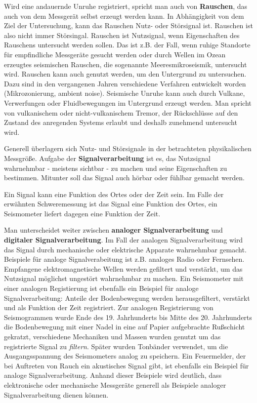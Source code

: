 Wird eine andauernde Unruhe registriert, spricht man auch von {\bf Rauschen}, das auch von dem Messgerät selbst erzeugt werden kann. In Abhängigkeit von dem Ziel der Untersuchung, kann das Rauschen Nutz- oder Störsignal ist.  Rauschen ist also nicht immer Störsingal. Rauschen ist Nutzsignal, wenn Eigenschaften des Rauschens untersucht werden sollen. Das ist z.B. der Fall, wenn ruhige Standorte für empfindliche Messgeräte gesucht werden oder durch Wellen im Ozean erzeugtes seismischen Rauschen, die sogenannte Meeresmikroseismik, untersucht wird. Rauschen kann auch genutzt werden, um den Untergrund zu untersuchen. Dazu sind in den vergangenen Jahren verschiedene Verfahren entwickelt worden (Mikrozonierung, ambient noise). Seismische Unruhe kann auch durch Vulkane, Verwerfungen oder Fluidbewegungen im Untergrund erzeugt werden. Man spricht von vulkanischem oder nicht-vulkanischem Tremor, der Rückschlüsse auf den Zustand des anregenden Systems erlaubt und deshalb zunehmend untersucht wird.  

Generell überlagern sich Nutz- und Störsignale in der betrachteten physikalischen Messgröße. Aufgabe der {\bf Signalverarbeitung} ist es, das Nutzsignal wahrnehmbar - meistens sichtbar - zu machen und seine Eigenschaften zu bestimmen. Mitunter soll das Signal auch hörbar oder fühlbar gemacht werden.    

Ein Signal kann eine Funktion des Ortes oder der Zeit sein. Im Falle der erwähnten Schweremessung ist das Signal eine Funktion des Ortes, ein Seismometer liefert dagegen eine Funktion der Zeit.

Man unterscheidet weiter zwischen \textbf{analoger Signalverarbeitung} und \textbf{digitaler Signalverarbeitung}. Im Fall der analogen Signalverarbeitung wird das Signal durch mechanische oder elektrische Apparate wahrnehmbar gemacht. Beispiele für analoge Signalverabeitung ist z.B. analoges Radio oder Fernsehen. Empfangene elektromagnetische Wellen werden gefiltert und verstärkt, um das Nutzsignal möglichst ungestört wahrnehmbar zu machen. Ein Seismometer mit einer analogen Registierung ist ebenfalls ein Beispiel für analoge Signalverarbeitung: Anteile der Bodenbewegung werden herausgefiltert, verstärkt und als Funktion der Zeit registriert. Zur analogen Registrierung von Seismogrammen wurde Ende des 19. Jahrhunderts bis Mitte des 20. Jahrhunderts die Bodenbewegung mit einer Nadel in eine auf Papier aufgebrachte Rußschicht gekratzt, verschiedene Mechaniken und Massen wurden genutzt um das registrierte Signal zu \textit{filtern}. Später wurden Tonbänder verwendet, um die Ausgangsspannung des Seismometers analog zu speichern. Ein Feuermelder, der bei Auftreten von Rauch ein akustisches Signal gibt, ist ebenfalls ein Beispiel für analoge Signalverarbeitung. Anhand dieser Beispiele wird deutlich, dass elektronische oder mechanische Messgeräte generell als Beispiele analoger Signalverarbeitung dienen können.

